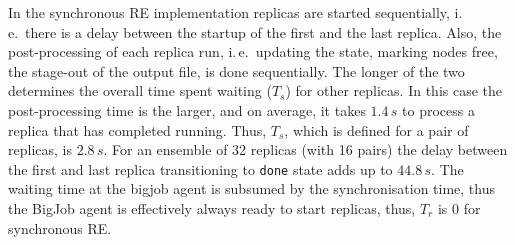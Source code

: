 \documentclass{rspublic}
\newcommand{\alnote}[1]{ {\textcolor{blue} { ***andre: #1 }}}
\newcommand{\athotanote}[1]{ {\textcolor{green} { ***athota: #1 }}}
\newcommand{\alnote}[1]{}
\newcommand{\athotanote}[1]{}
\begin{document}
In the synchronous RE implementation replicas are started
sequentially, i.\,e.\ there is a delay between the startup of the
first and the last replica. Also, the post-processing of each replica
run, i.\,e.\ updating the state, marking nodes free, the stage-out of
the output file, is done sequentially. The longer of the two
determines the overall time spent waiting ($T_s$) for other replicas.
In this case the post-processing time is the larger, and on average,
it takes $1.4\,s$
to process a replica that has completed running. Thus, $T_{s}$, which
is defined for a pair of replicas, is $2.8\,s$. For an ensemble of 32
replicas (with 16 pairs) the delay between the first and last replica
transitioning to \texttt{done} state adds up to $44.8\,s$.  The
waiting time at the bigjob agent is subsumed by the synchronisation
time, thus the BigJob agent is effectively always ready to start
replicas, thus, $T_r$ is 0 for synchronous RE.







\end{document}
